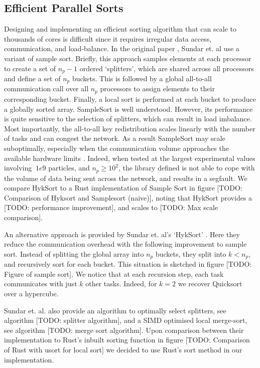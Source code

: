 \subsection*{Efficient Parallel Sorts}

Designing and implementing an efficient sorting algorithm that can scale to thousands of cores is difficult since it requires irregular data access, communication, and load-balance. In the original paper \cite{sundar2008bottom}, Sundar et. al use a variant of sample sort. Briefly, this approach samples elements at each processor to create a set of $n_p - 1 $ ordered `splitters', which are shared across all processors and define a set of $n_p$ buckets. This is followed by a global all-to-all communication call over all $n_p$ processors to assign elements to their corresponding bucket. Finally, a local sort is performed at each bucket to produce a globally sorted array. SampleSort is well understood. However, its performance is quite sensitive to the selection of splitters, which can result in load imbalance. Most importantly, the all-to-all key redistribution scales linearly with the number of tasks and can congest the network. As a result SampleSort may scale suboptimally, especially when the communication volume approaches the available hardware limits \cite{sundar2013hyksort}. Indeed, when tested at the largest experimental values involving $~1e9$ particles, and $n_p \geq 10^2$, the library defined  is not able to cope with the volume of data being sent across the network, and results in a segfault. We compare HykSort to a Rust implementation of Sample Sort in figure [TODO: Comparison of Hyksort and Samplesort (naive)], noting that HykSort provides a [TODO: performance improvement], and scales to [TODO: Max scale comparison].

An alternative approach is provided by Sundar et. al's `HykSort' \cite{sundar2013hyksort}. Here they reduce the communication overhead with the following improvement to sample sort. Instead of splitting the global array into $n_p$ buckets, they split into $k < n_p$, and recursively sort for each bucket. This situation is sketched in figure [TODO: Figure of sample sort]. We notice that at each recursion step, each task communicates with just $k$ other tasks. Indeed, for $k=2$ we recover Quicksort over a hypercube. 

Sundar et. al. also provide an algorithm to optimally select splitters, see algorithm [TODO: splitter algorithm], and a SIMD optimised local merge-sort, see algorithm [TODO: merge sort algorithm]. Upon comparison between their implementation to Rust's inbuilt sorting function in figure [TODO: Comparison of Rust with usort for local sort] we decided to use Rust's sort method in our implementation.

